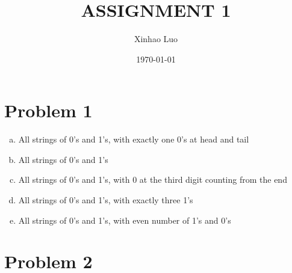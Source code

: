\documentclass{article}
\title{\bf \Large ASSIGNMENT 1}
\author{Xinhao Luo}
\date{\today}
\begin{document}
\maketitle
\medskip

\clearpage

\section{Problem 1}

\begin{enumerate}[a)]
    \item All strings of 0's and 1's, with exactly one 0's at head and tail
    \item All strings of 0's and 1's
    \item All strings of 0's and 1's, with 0 at the third digit counting from the end
    \item All strings of 0's and 1's, with exactly three 1's
    \item All strings of 0's and 1's, with even number of 1's and 0's
\end{enumerate}

\clearpage

\section{Problem 2}
\end{document}
